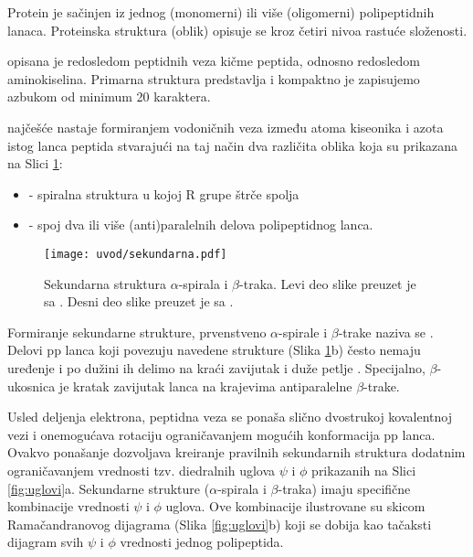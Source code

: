 Protein je sačinjen iz jednog (monomerni) ili više (oligomerni) polipeptidnih lanaca.
Proteinska struktura (oblik) opisuje se kroz četiri nivoa rastuće složenosti.

 opisana je redosledom peptidnih veza kičme peptida,
odnosno redosledom aminokiselina. Primarna struktura predstavlja  i kompaktno je zapisujemo azbukom od minimum 20 karaktera.

 najčešće nastaje formiranjem vodoničnih veza
između atoma kiseonika i azota istog lanca peptida stvarajući na taj način
dva različita oblika koja su prikazana na Slici \ref{fig:sekundarna}:
\begin{itemize}
  \item {}  - spiralna struktura u kojoj R grupe štrče spolja
  \item {}  - spoj dva ili više (anti)paralelnih delova polipeptidnog lanca.
\end{itemize}

\begin{figure}[th]
\centering
\texttt{[image: uvod/sekundarna.pdf]}
\caption {
  Sekundarna struktura $\alpha$-spirala i $\beta$-traka. \footnotesize Levi deo slike preuzet je sa \parencite{sekundarna_ref_a}.
  Desni deo slike preuzet je sa \parencite{sekundarna_ref_b}.
}
\label{fig:sekundarna}
\end{figure}

Formiranje sekundarne strukture, prvenstveno $\alpha$-spirale i $\beta$-trake
naziva se  .
Delovi pp lanca  koji povezuju navedene strukture (Slika \ref{fig:sekundarna}b)
često nemaju uređenje i po dužini ih delimo na kraći zavijutak i duže petlje
. Specijalno, $\beta$-ukosnica 
je kratak zavijutak lanca na krajevima antiparalelne $\beta$-trake. 

Usled deljenja elektrona,  peptidna veza se ponaša slično dvostrukoj kovalentnoj
vezi i onemogućava rotaciju ograničavanjem mogućih konformacija pp lanca.
Ovakvo ponašanje dozvoljava kreiranje pravilnih sekundarnih struktura
dodatnim ograničavanjem vrednosti tzv.  diedralnih uglova $\psi$ i $\phi$ prikazanih
na Slici \ref{fig:uglovi}a. 
Sekundarne strukture ($\alpha$-spirala i $\beta$-traka) imaju specifične kombinacije
vrednosti $\psi$ i $\phi$ uglova. Ove kombinacije ilustrovane su skicom
Ramačandranovog dijagrama (Slika \ref{fig:uglovi}b) koji se dobija kao
tačaksti dijagram  svih $\psi$ i $\phi$ vrednosti jednog polipeptida.

